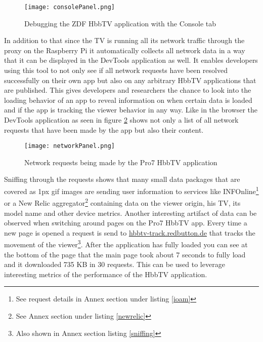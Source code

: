 \begin{figure}[htb]
  \centering
  \hspace*{-0.7cm}
  \texttt{[image: consolePanel.png]}\\
  \caption{Debugging the ZDF HbbTV application with the Console tab}\label{fig:consolePanel}
\end{figure}

In addition to that since the TV is running all its network traffic through the proxy on the Raspberry Pi
it automatically collects all network data in a way that it can be displayed in the DevTools application as well.
It enables developers using this tool to not only see if all network requests have been resolved successfully
on their own app but also on any arbitrary HbbTV applications that are published. This gives developers and
researchers the chance to look into the loading behavior of an app to reveal information on when certain data
is loaded and if the app is tracking the viewer behavior in any way. Like in the browser the DevTools application
as seen in figure \ref{fig:networkPanel} shows not only a list of all network requests that have been made by the
app but also their content.

\begin{figure}[htb]
  \centering
  \hspace*{-0.7cm}
  \texttt{[image: networkPanel.png]}\\
  \caption{Network requests being made by the Pro7 HbbTV application}\label{fig:networkPanel}
\end{figure}

Sniffing through the requests shows that many small data packages that are covered as 1px gif images are
sending user information to services like INFOnline\footnote{See request details in Annex section under
listing \ref{ioam}} or a New Relic aggregator\footnote{See Annex section under listing \ref{newrelic}}
containing data on the viewer origin, his TV, its model name and other device metrics. Another
interesting artifact of data can be observed when switching around pages on the Pro7 HbbTV app. Every time
a new page is opened a request is send to \url{hbbtv-track.redbutton.de} that tracks the movement of the
viewer\footnote{Also shown in Annex section listing \ref{sniffing}}. After the application has fully loaded
you can see at the bottom of the page that the main page took about 7 seconds to fully load and it
downloaded 735 KB in 30 requests. This can be used to leverage interesting metrics of the performance of
the HbbTV application.

